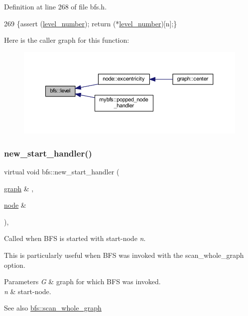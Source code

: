 Definition at line 268 of file bfs.\+h.


\begin{DoxyCode}
269     \{assert (\mbox{\hyperlink{classbfs_aab92e9d128612c28324aafe4750dbc84}{level\_number}}); \textcolor{keywordflow}{return} (*\mbox{\hyperlink{classbfs_aab92e9d128612c28324aafe4750dbc84}{level\_number}})[n];\}
\end{DoxyCode}
Here is the caller graph for this function\+:
\nopagebreak
\begin{figure}[H]
\begin{center}
\leavevmode
\includegraphics[width=350pt]{classbfs_ac0158a0453fb17a89be4049d21db56b1_icgraph}
\end{center}
\end{figure}
\mbox{\label{classbfs_ab89a3d1cb36b20a86837b0345063e4b1}} 
\subsubsection{\texorpdfstring{new\+\_\+start\+\_\+handler()}{new\_start\_handler()}}
{\footnotesize\ttfamily virtual void bfs\+::new\+\_\+start\+\_\+handler (\begin{DoxyParamCaption}\item[{\mbox{\hyperlink{classgraph}{graph}} \&}]{,  }\item[{\mbox{\hyperlink{classnode}{node}} \&}]{ }\end{DoxyParamCaption})\hspace{0.3cm}{\ttfamily [inline]}, {\ttfamily [virtual]}}



Called when B\+FS is started with start-\/node {\itshape n}. 

This is particularly useful when B\+FS was invoked with the {\ttfamily scan\+\_\+whole\+\_\+graph} option.


\begin{DoxyParams}{Parameters}
{\em G} & graph for which B\+FS was invoked. \\
\hline
{\em n} & start-\/node. \\
\hline
\end{DoxyParams}
\begin{DoxySeeAlso}{See also}
\mbox{\hyperlink{classbfs_a25fc51b1bfbbdd3afefe0a84c1bd2f6b}{bfs\+::scan\+\_\+whole\+\_\+graph}} 
\end{DoxySeeAlso}


